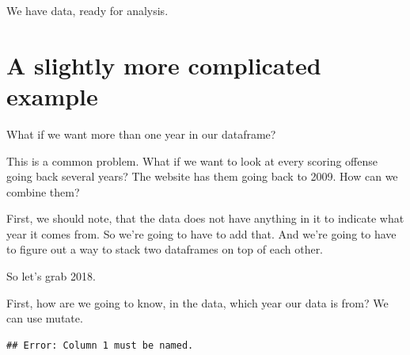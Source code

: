 \documentclass[]{book}
\newenvironment{Shaded}{\begin{snugshade}}{\end{snugshade}}
\newcommand{\DataTypeTok}[1]{\textcolor[rgb]{0.13,0.29,0.53}{#1}}
\newcommand{\DecValTok}[1]{\textcolor[rgb]{0.00,0.00,0.81}{#1}}
\newcommand{\KeywordTok}[1]{\textcolor[rgb]{0.13,0.29,0.53}{\textbf{#1}}}
\newcommand{\NormalTok}[1]{#1}
\newcommand{\OperatorTok}[1]{\textcolor[rgb]{0.81,0.36,0.00}{\textbf{#1}}}
\newcommand{\StringTok}[1]{\textcolor[rgb]{0.31,0.60,0.02}{#1}}
\begin{document}
We have data, ready for analysis.

\hypertarget{a-slightly-more-complicated-example}{%
\section{A slightly more complicated example}\label{a-slightly-more-complicated-example}}

What if we want more than one year in our dataframe?

This is a common problem. What if we want to look at every scoring offense going back several years? The website has them going back to 2009. How can we combine them?

First, we should note, that the data does not have anything in it to indicate what year it comes from. So we're going to have to add that. And we're going to have to figure out a way to stack two dataframes on top of each other.

So let's grab 2018.

\begin{Shaded}
\end{Shaded}

First, how are we going to know, in the data, which year our data is from? We can use mutate.

\begin{Shaded}
\end{Shaded}

\begin{verbatim}
## Error: Column 1 must be named.
\end{verbatim}
\end{document}
